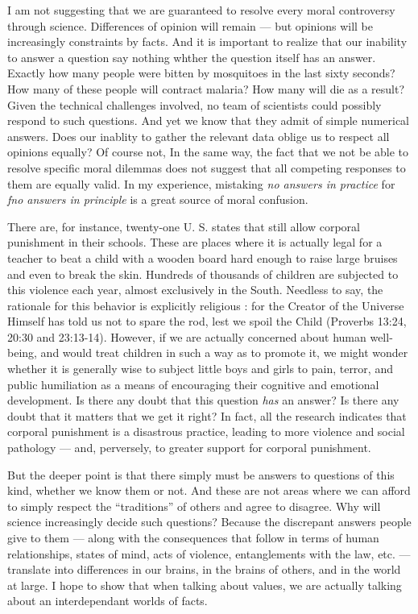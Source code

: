 \documentclass[a4paper,12pt]{extbook}
\begin{document}
I am not suggesting that we are guaranteed to resolve every moral controversy through science.
Differences of opinion will remain --- but opinions will be increasingly constraints by facts.
And it is important to realize that our inability to answer a question say nothing whther the question itself has an answer.
Exactly how many people were bitten by mosquitoes in the last sixty seconds?
How many of these people will contract malaria?
How many will die as a result?
Given the technical challenges involved, no team of scientists could possibly respond to such questions.
And yet we know that they admit of simple numerical answers.
Does our inablity to gather the relevant data oblige us to respect all opinions equally?
Of course not,
In the same way, the fact that we not be able to resolve specific moral dilemmas does not suggest that all competing responses to them are equally valid.
In my experience, mistaking \textit{no answers in practice} for \textit{fno answers in principle} is a great source of moral confusion.

There are, for instance, twenty-one U. S. states that still allow corporal punishment in their schools.
These are places where it is actually legal for a teacher to beat a child with a wooden board hard enough to raise large bruises and even to break the skin.
Hundreds of thousands of children are subjected to this violence each year, almost exclusively in the South.
Needless to say, the rationale for this behavior is explicitly religious :
for the Creator of the Universe Himself has told us not to spare the rod, lest we spoil the Child (Proverbs 13:24, 20:30 and 23:13-14).
However, if we are actually concerned about human well-being, and would treat children in such a way as to promote it, we might wonder whether it is generally wise to subject little boys and girls to pain, terror, and public humiliation as a means of encouraging their cognitive and emotional development.
Is there any doubt that this question \textit{has} an answer?
Is there any doubt that it matters that we get it right?
In fact, all the research indicates that corporal punishment is a disastrous practice, leading to more violence and social pathology --- and, perversely, to greater support for corporal punishment.

But the deeper point is that there simply must be answers to questions of this kind, whether we know them or not.
And these are not areas where we can afford to simply respect the ``traditions'' of others and agree to disagree.
Why will science increasingly decide such questions?
Because the discrepant answers people give to them --- along with the consequences that follow in terms of human relationships, states of mind, acts of violence, entanglements with the law, etc. --- translate into differences in our brains, in the brains of others, and in the world at large.
I hope to show that when talking about values, we are actually talking about an interdependant worlds of facts.
\end{document}
